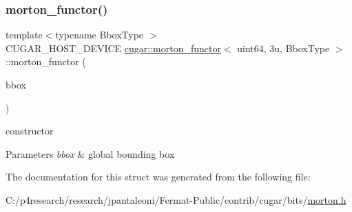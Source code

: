 \subsubsection{\texorpdfstring{morton\+\_\+functor()}{morton\_functor()}}
{\footnotesize\ttfamily template$<$typename Bbox\+Type $>$ \\
C\+U\+G\+A\+R\+\_\+\+H\+O\+S\+T\+\_\+\+D\+E\+V\+I\+CE \hyperlink{structcugar_1_1morton__functor}{cugar\+::morton\+\_\+functor}$<$ uint64, 3u, Bbox\+Type $>$\+::morton\+\_\+functor (\begin{DoxyParamCaption}\item[{const Bbox\+Type \&}]{bbox }\end{DoxyParamCaption})\hspace{0.3cm}{\ttfamily [inline]}}

constructor


\begin{DoxyParams}{Parameters}
{\em bbox} & global bounding box \\
\hline
\end{DoxyParams}


The documentation for this struct was generated from the following file\+:\begin{DoxyCompactItemize}
\item 
C\+:/p4research/research/jpantaleoni/\+Fermat-\/\+Public/contrib/cugar/bits/\hyperlink{morton_8h}{morton.\+h}\end{DoxyCompactItemize}
